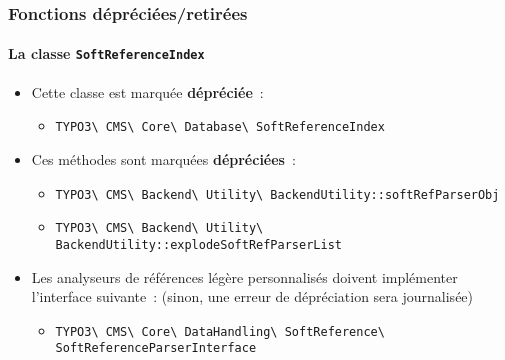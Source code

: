 %

\begin{frame}[fragile]
	\frametitle{Fonctions dépréciées/retirées}
	\framesubtitle{La classe \texttt{SoftReferenceIndex}}


	\begin{itemize}
		\item Cette classe est marquée \textbf{dépréciée}~:
			\begin{itemize}\smaller
				\item \texttt{TYPO3\textbackslash
					CMS\textbackslash
					Core\textbackslash
					Database\textbackslash
					SoftReferenceIndex}
			\end{itemize}\normalsize
		\vspace{0.1cm}
		\item Ces méthodes sont marquées \textbf{dépréciées}~:
			\begin{itemize}\smaller
				\item \texttt{TYPO3\textbackslash
					CMS\textbackslash
					Backend\textbackslash
					Utility\textbackslash
					BackendUtility::softRefParserObj}
				\item \texttt{TYPO3\textbackslash
					CMS\textbackslash
					Backend\textbackslash
					Utility\textbackslash
					BackendUtility::explodeSoftRefParserList}
			\end{itemize}\normalsize
		\vspace{0.1cm}
		\item Les analyseurs de références légère personnalisés doivent implémenter l'interface suivante~:\newline
			\small(sinon, une erreur de dépréciation sera journalisée)\normalsize
				\begin{itemize}\smaller
					\item \fontsize{7}{9}\selectfont
					\texttt{TYPO3\textbackslash
						CMS\textbackslash
						Core\textbackslash
						DataHandling\textbackslash
						SoftReference\textbackslash
						SoftReferenceParserInterface}
			\end{itemize}\normalsize
	\end{itemize}

\end{frame}

